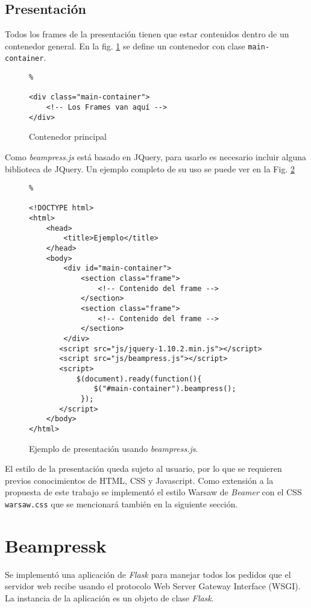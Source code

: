 		\subsection{Presentación} %
		\label{sub:presentacion}
			Todos los frames de la presentación tienen que estar contenidos dentro de un contenedor general. En la fig. \ref{fig:main_container} se define un contenedor con clase \texttt{main-container}.
		
			\begin{figure}[htb]%
				\begin{lstlisting}%

<div class="main-container">
	<!-- Los Frames van aquí -->
</div>
				\end{lstlisting}
			\caption{Contenedor principal}
			\label{fig:main_container}
			\end{figure}				


			Como \textit{beampress.js} está basado en JQuery, para usarlo es necesario incluir alguna biblioteca de JQuery. Un ejemplo completo de su uso se puede ver en la Fig. \ref{fig:ex5}

			\begin{figure}[htb]%
				\begin{lstlisting}%

<!DOCTYPE html>
<html>
	<head>
    	<title>Ejemplo</title>
	</head>
	<body>
		<div id="main-container">
			<section class="frame">
				<!-- Contenido del frame -->
			</section>
			<section class="frame">
				<!-- Contenido del frame -->
			</section>						
		</div>
	   <script src="js/jquery-1.10.2.min.js"></script>
	   <script src="js/beampress.js"></script>
	   <script>
	       $(document).ready(function(){     
	           $("#main-container").beampress();
	        });
	   </script>		
	</body>
</html>			
				\end{lstlisting}
			\caption{
				Ejemplo de presentación usando \textit{beampress.js}. 
				\label{fig:ex5} }
			\end{figure}	

			El estilo de la presentación queda sujeto al usuario, por lo que se requieren previos conocimientos de HTML, CSS y Javascript. Como extensión a la propuesta de este trabajo se implementó el estilo Warsaw de \textit{Beamer} con el CSS \texttt{warsaw.css} que se mencionará también en la siguiente sección.

	\section{Beampressk} %
	\label{sec:beampressk_imp}
		Se implementó una aplicación de \textit{Flask} para manejar todos los pedidos que el servidor web recibe usando el protocolo Web Server Gateway Interface (WSGI). La instancia de la aplicación es un objeto de clase \textit{Flask}.

